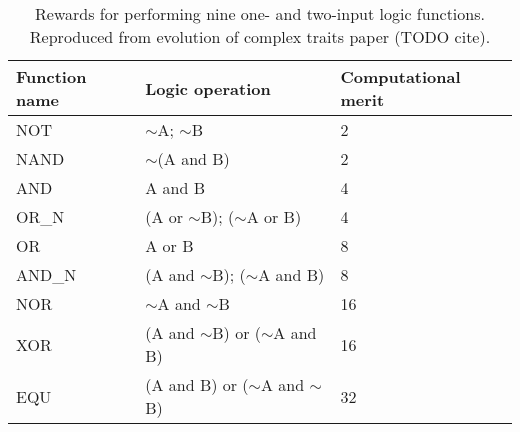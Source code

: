 \begin{table}[h]
\centering
\caption{Rewards for performing nine one- and two-input logic functions. Reproduced from evolution of complex traits paper (TODO cite).}
\begin{tabular}{lll}
\hline
Function name & Logic operation & Computational merit \\
\hline
NOT & $\sim$A; $\sim$B & 2 \\
NAND & $\sim$(A and B) & 2 \\
AND & A and B & 4 \\
OR\_N & (A or $\sim$B); ($\sim$A or B) & 4 \\
OR & A or B & 8 \\
AND\_N & (A and $\sim$B); ($\sim$A and B) & 8 \\
NOR & $\sim$A and $\sim$B & 16 \\
XOR & (A and $\sim$B) or ($\sim$A and B) & 16 \\
EQU & (A and B) or ($\sim$A and $\sim$B) & 32 \\
\hline
\end{tabular}
\end{table}
